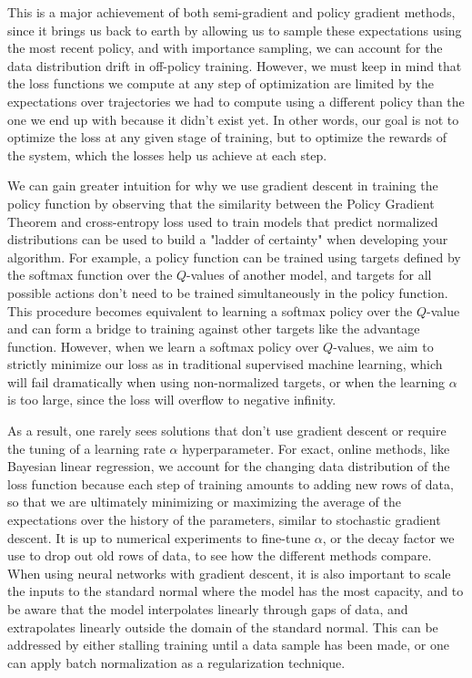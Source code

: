 \documentclass{article}
\begin{document}
This is a major achievement of both semi-gradient and policy gradient methods, since it brings us back to earth by allowing us to sample these expectations using the most recent policy, and with importance sampling, we can account for the data distribution drift in off-policy training. However, we must keep in mind that the loss functions we compute at any step of optimization are limited by the expectations over trajectories we had to compute using a different policy than the one we end up with because it didn't exist yet. In other words, our goal is not to optimize the loss at any given stage of training, but to optimize the rewards of the system, which the losses help us achieve at each step. 

We can gain greater intuition for why we use gradient descent in training the policy function by observing that the similarity between the Policy Gradient Theorem and cross-entropy loss used to train models that predict normalized distributions can be used to build a "ladder of certainty" when developing your algorithm. For example, a policy function can be trained using targets defined by the softmax function over the $Q$-values of another model, and targets for all possible actions don't need to be trained simultaneously in the policy function. This procedure becomes equivalent to learning a softmax policy over the $Q$-value and can form a bridge to training against other targets like the advantage function. However, when we learn a softmax policy over $Q$-values, we aim to strictly minimize our loss as in traditional supervised machine learning, which will fail dramatically when using non-normalized targets, or when the learning $\alpha$ is too large, since the loss will overflow to negative infinity.

As a result, one rarely sees solutions that don't use gradient descent or require the tuning of a learning rate $\alpha$ hyperparameter. For exact, online methods, like Bayesian linear regression, we account for the changing data distribution of the loss function because each step of training amounts to adding new rows of data, so that we are ultimately minimizing or maximizing the average of the expectations over the history of the parameters, similar to stochastic gradient descent. It is up to numerical experiments to fine-tune $\alpha$, or the decay factor we use to drop out old rows of data, to see how the different methods compare. When using neural networks with gradient descent, it is also important to scale the inputs to the standard normal where the model has the most capacity, and to be aware that the model interpolates linearly through gaps of data, and extrapolates linearly outside the domain of the standard normal. This can be addressed by either stalling training until a data sample has been made, or one can apply batch normalization\cite{batch_normalization} as a regularization technique.
\end{document}
